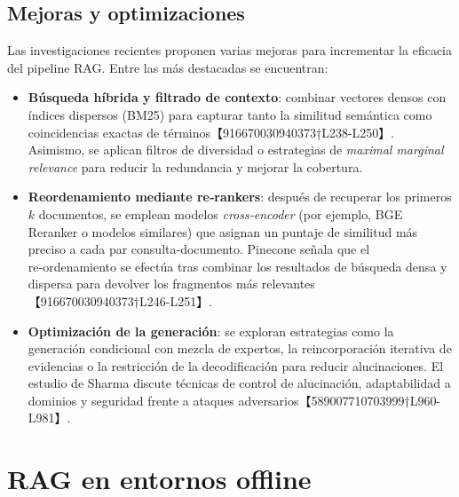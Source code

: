 \subsection{Mejoras y optimizaciones}

Las investigaciones recientes proponen varias mejoras para incrementar la eficacia del pipeline RAG.  Entre las más destacadas se encuentran:

\begin{itemize}
  \item \textbf{Búsqueda híbrida y filtrado de contexto}: combinar vectores densos con índices dispersos (BM25) para capturar tanto la similitud semántica como coincidencias exactas de términos【916670030940373†L238-L250】.  Asimismo, se aplican filtros de diversidad o estrategias de \textit{maximal marginal relevance} para reducir la redundancia y mejorar la cobertura.
  \item \textbf{Reordenamiento mediante re‑rankers}: después de recuperar los primeros $k$ documentos, se emplean modelos \textit{cross‑encoder} (por ejemplo, BGE Reranker o modelos similares) que asignan un puntaje de similitud más preciso a cada par consulta‑documento.  Pinecone señala que el re‑ordenamiento se efectúa tras combinar los resultados de búsqueda densa y dispersa para devolver los fragmentos más relevantes【916670030940373†L246-L251】.
  \item \textbf{Optimización de la generación}: se exploran estrategias como la generación condicional con mezcla de expertos, la reincorporación iterativa de evidencias o la restricción de la decodificación para reducir alucinaciones.  El estudio de Sharma \cite{sharma2025survey} discute técnicas de control de alucinación, adaptabilidad a dominios y seguridad frente a ataques adversarios【589007710703999†L960-L981】.
\end{itemize}

\section{RAG en entornos offline}

